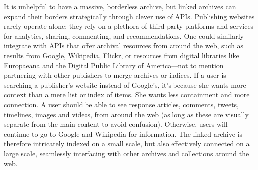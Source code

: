 It is unhelpful to have a massive, borderless archive, but linked archives can expand their borders strategically through clever use of APIs. Publishing websites rarely operate alone; they rely on a plethora of third-party platforms and services for analytics, sharing, commenting, and recommendations. One could similarly integrate with APIs that offer archival resources from around the web, such as results from Google, Wikipedia, Flickr, or resources from digital libraries like Europaeana and the Digital Public Library of America---not to mention partnering with other publishers to merge archives or indices. If a user is searching a publisher's website instead of Google's, it's because she wants more context than a mere list or index of items. She wants less containment and more connection. A user should be able to see response articles, comments, tweets, timelines, images and videos, from around the web (as long as these are visually separate from the main content to avoid confusion). Otherwise, users will continue to go to Google and Wikipedia for information. The linked archive is therefore intricately indexed on a small scale, but also effectively connected on a large scale, seamlessly interfacing with other archives and collections around the web.




